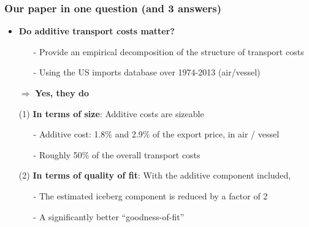 \documentclass[10 pt,Helvetica, french]{beamer}
\begin{document}
\begin{frame}
\frametitle{Our paper in one question (and 3 answers)}

\begin{itemize}
\item  \textbf{Do additive transport costs matter?} \vspace{0.1cm}
\begin{itemize}
\item[-] Provide an empirical decomposition of the structure of transport costs \vspace{0.1cm}
\item[-] Using the US imports database over 1974-2013 (air/vessel)\vspace{0.2cm}
\end{itemize}
\item[$\Rightarrow$] \textbf{Yes, they do} \vspace{0.1cm}

\item[(1)] \textbf{In terms of size}: Additive costs are sizeable \vspace{0.1cm}
\begin{itemize}
\item[-] Additive cost: 1.8\% and 2.9\% of the export price, in air / vessel \vspace{0.1cm}
\item[-] Roughly 50\% of the overall transport costs \vspace{0.1cm}

\end{itemize}
\item[(2)] \textbf{In terms of quality of fit}: With the additive component included, \vspace{0.1cm}
\begin{itemize}
\item[-] The estimated iceberg component is reduced by a factor of 2 \vspace{0.1cm}
\item[-] A significantly better ``goodness-of-fit'' %
\end{itemize}
\end{itemize}
\end{frame}
\end{document}
